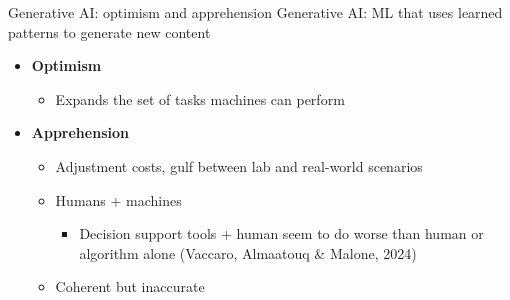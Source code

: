 \documentclass[aspectratio=169,t,11pt,table]{beamer}
\begin{document}

\begin{frame}{Generative AI: optimism and apprehension}
\alert{Generative AI:} ML that uses learned patterns to generate new content
\smallskip
\begin{itemize}
    \item \textbf{Optimism}
    \begin{itemize}
        \item Expands the set of tasks machines can perform
        \medskip
    \end{itemize}
    \medskip
    \item \textbf{Apprehension}
        \begin{itemize}
            \item Adjustment costs, gulf between lab and real-world scenarios
        \medskip
        \pause 
        \item Humans + machines 
        \begin{itemize}
            \item Decision support tools + human seem to do worse than human or algorithm alone (Vaccaro, Almaatouq \& Malone, 2024)
        \end{itemize}
        \medskip
    \item Coherent but inaccurate
    \end{itemize}
\end{itemize}
\end{frame}
\end{document}
